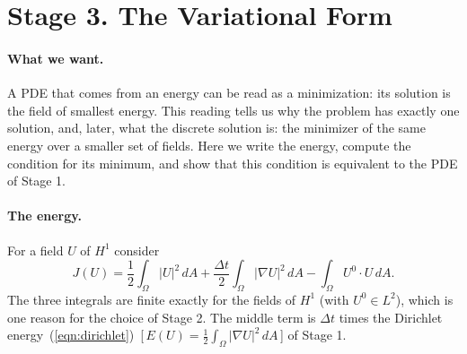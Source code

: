 \section{Stage 3. The Variational Form}
\label{section:r1_variational}

\paragraph{What we want.} A PDE that comes from an energy can be read as a minimization: its solution is the field of smallest energy. This reading tells us why the problem has exactly one solution, and, later, what the discrete solution is: the minimizer of the same energy over a smaller set of fields. Here we write the energy, compute the condition for its minimum, and show that this condition is equivalent to the PDE of Stage 1.

\paragraph{The energy.} For a field $U$ of $H^1$ consider
\begin{equation}
\label{eqn:weak_energy}
J(U) = \frac12 \int_\Omega |U|^2\, dA + \frac{\Delta t}{2} \int_\Omega |\nabla U|^2\, dA - \int_\Omega U^0 \cdot U\, dA .
\end{equation}
The three integrals are finite exactly for the fields of $H^1$ (with $U^0 \in L^2$), which is one reason for the choice of Stage 2. The middle term is $\Delta t$ times the Dirichlet energy~(\ref{eqn:dirichlet})~[\,$E(U) = \frac12\int_\Omega|\nabla U|^2\,dA$\,] of Stage 1.

